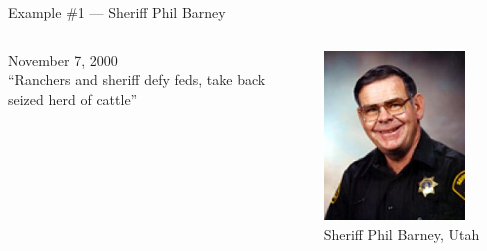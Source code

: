 \begin{frame}{Example \#1 --- Sheriff Phil Barney}
    \begin{columns}[onlytextwidth]
            November 7, 2000 \\
            \vspace{10pt}
            { \Large ``Ranchers and sheriff defy feds, take back seized herd of cattle'' }

            \centering
            \includegraphics[width=0.75\textwidth]{img/phil-barney.png} \\
            Sheriff Phil Barney, Utah \\
    \end{columns}
\end{frame}

